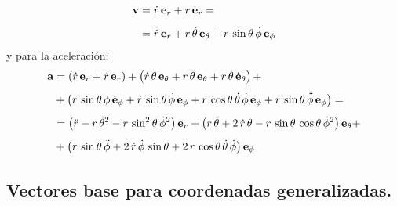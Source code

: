 \documentclass[12pt]{article}
\begin{document}
\begin{align}
\begin{aligned}
\vb{v} &= \dot{r} \, \vb{e}_{r} + r \, \dot{\vb{e}}_{r} = \\[0.5em]
&= \dot{r} \, \vb{e}_{r} + r \, \dot{\theta} \, \vb{e}_{\theta} + r \, \sin \theta \, \dot{\phi} \, \vb{e}_{\phi}
\end{aligned}
\label{eq:ecuacion_02_51}
\end{align}
y para la aceleración:
\begin{align}
\begin{aligned}[b]
\vb{a} &= \left( \dot{r} \, \vb{e}_{r} + \dot{r} \, \vb{e}_{r} \right) + \left( \dot{r} \, \dot{\theta} \, \vb{e}_{\theta} + r \, \ddot{\theta} \, \vb{e}_{\theta} + r \, \theta \, \dot{\vb{e}}_{\theta} \right) + \\[0.5em]
&+ \left( r \, \sin \theta \, \phi \, \dot{\vb{e}}_{\phi} + \dot{r} \, \sin \theta \, \dot{\phi} \, \vb{e}_{\phi} + r \, \cos \theta \, \dot{\theta} \, \dot{\phi} \, \vb{e}_{\phi} + r \, \sin \theta \, \ddot{\phi} \, \vb{e}_{\phi} \right) = \\[0.5em]
&= \left( \ddot{r} - r \, \dot{\theta}^{2} - r \, \sin^{2} \theta \, \dot{\phi}^{2} \right) \vb{e}_{r} + \left( r \, \ddot{\theta} + 2 \, \dot{r} \, \theta - r \, \sin \theta \, \cos \theta \, \dot{\phi}^{2} \right) \vb{e}_{\theta} + \\[0.5em]
&+ \left( r \, \sin \theta \, \ddot{\phi} + 2 \, \dot{r} \, \dot{\phi} \, \sin \theta + 2 \, r \, \cos \theta \, \dot{\theta} \, \dot{\phi} \right) \vb{e}_{\phi}
\end{aligned}
\label{eq:ecuacion_02_52}
\end{align}

\subsection{Vectores base para coordenadas generalizadas.}
\end{document}
